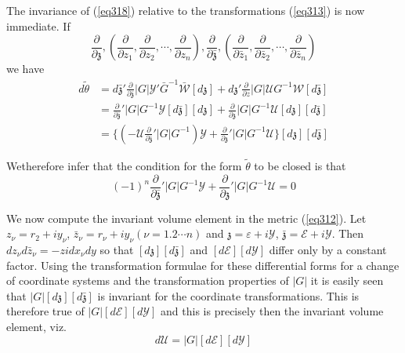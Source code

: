  The invariance of (\ref{eq318}) relative to the transformations
 (\ref{eq313}) is  now immediate. If   
 \begin{equation*}
\frac{\partial}{\partial \mathfrak{z}}, (\frac{\partial}{\partial
  z_1}, \frac{\partial}{\partial z_2}, \cdots,
\frac{\partial}{\partial z_n}), \frac{\partial}{\partial \bar
  {\mathfrak{z}}}, (\frac{\partial}{\partial \bar{z}_1},
\frac{\partial}{\partial \bar{z}_2}, \cdots, \frac{\partial}{\partial
  \bar{z}_n}) \tag{319}\label{eq319} 
 \end{equation*} 
 we have 
 \begin{align*}
d \tilde{\theta} & = d \bar{\mathfrak{z}}' \frac{\partial}{\partial
  \bar {\mathfrak{z}}} |G| \mathscr{Y}' \bar {G} ^{-1} \bar
{\mathscr{W}} [ d \mathfrak{z}] +  d \mathfrak{z}'
\frac{\partial}{\partial z} |G| \mathscr{U}  G^{-1}{\mathscr{W}} [ d
  \bar {\mathfrak{z}}] \\ 
& = \frac{\partial}{\partial \bar {\mathfrak{z}}}' |G| G^{-1}
\mathscr{Y} [d \bar{\mathfrak{z}}] [ d \mathfrak{z}] +
\frac{\partial}{\partial \mathfrak{z}} |G| G^{-1} \mathscr{U} [d
  \mathfrak{z}] [d \bar{\mathfrak{z}}]\\ 
& = \{  (- \mathscr{U} \frac{\partial}{\partial \bar{\mathfrak{z}}}'
|G| G^{-1}) \mathscr{Y} + \frac{\partial}{\partial \mathfrak{z}}' |G|
G^{-1} \mathscr{U} \} [d \mathfrak{z}] [d \bar{\mathfrak{z}}]
\tag{320}\label{eq320} 
 \end{align*} 
 
 We\pageoriginale therefore infer that the condition for the form
 $\tilde{\theta}$  to be closed is that   
 \begin{equation*}
(-1)^n \frac{\partial} { \partial \bar {\mathfrak{z}}} '|G| G^{-1}
   \mathscr{Y} + \frac{\partial} { \partial  \mathfrak{z}}' |G| G^{-1}
   \mathscr{U} = 0 \tag{321}\label{eq321}  
 \end{equation*} 
 
 We now compute the invariant volume element in the metric
 (\ref{eq312}). Let $ z_\nu = r_2 + iy_\nu $,  $\bar {z} _\nu = r_\nu +
 iy_\nu  (\nu = 1.2\cdots n)$ and $\mathfrak{z} = \varepsilon + i
 \mathscr{Y}$, $\bar {\mathfrak{z}} = \mathcal{E} + i
 \mathscr{Y}$. Then $dz_\nu d\bar{z}_\nu =- zi dx_\nu dy$ so that $[d
   \mathfrak{z}] [d \bar {\mathfrak{z}}]$ and $[d \mathcal{E}][d
   \mathscr{Y}]$ differ only by a constant factor. Using the
 transformation formulae for these differential forms for a change of
 coordinate  systems and the transformation properties of $|G|$ it is
 easily seen 
 that $|G| [ d \mathfrak{z}] [ d \bar {\mathfrak{z}}]$ is invariant
 for the coordinate transformations. This is therefore true of  $|G| [
   d \mathcal{E}] [ d \mathscr{Y}]$ and this is precisely then the
 invariant volume element, viz.  
 \begin{equation*}
d \mathscr{U} = |G| [ d \mathcal{E}] [ d \mathscr{Y}]
\tag{322}\label{eq322}   
 \end{equation*} 
 
